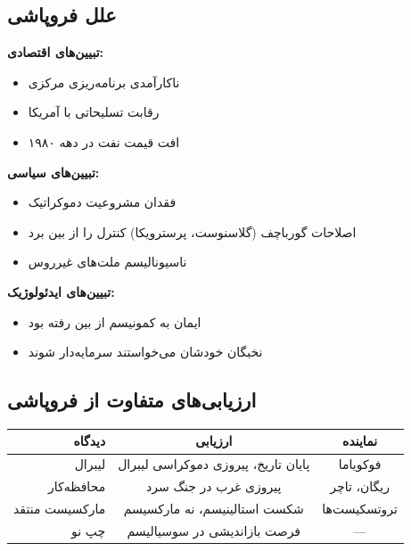 \subsection{علل فروپاشی}

\begin{debatebox}
\textbf{تبیین‌های اقتصادی:}
\begin{itemize}[nosep]
    \item ناکارآمدی برنامه‌ریزی مرکزی
    \item رقابت تسلیحاتی با آمریکا
    \item افت قیمت نفت در دهه ۱۹۸۰
\end{itemize}

\textbf{تبیین‌های سیاسی:}
\begin{itemize}[nosep]
    \item فقدان مشروعیت دموکراتیک
    \item اصلاحات گورباچف (گلاسنوست، پرسترویکا) کنترل را از بین برد
    \item ناسیونالیسم ملت‌های غیرروس
\end{itemize}

\textbf{تبیین‌های ایدئولوژیک:}
\begin{itemize}[nosep]
    \item ایمان به کمونیسم از بین رفته بود
    \item نخبگان خودشان می‌خواستند سرمایه‌دار شوند
\end{itemize}
\end{debatebox}

\subsection{ارزیابی‌های متفاوت از فروپاشی}

\begin{comparebox}
\begin{table}[H]
\centering
\small
\begin{tabular}{r|c|c}
\toprule
\textbf{دیدگاه} & \textbf{ارزیابی} & \textbf{نماینده} \\
\midrule
لیبرال & پایان تاریخ، پیروزی دموکراسی لیبرال & فوکویاما \\
\midrule
محافظه‌کار & پیروزی غرب در جنگ سرد & ریگان، تاچر \\
\midrule
مارکسیست منتقد & شکست استالینیسم، نه مارکسیسم & تروتسکیست‌ها \\
\midrule
چپ نو & فرصت بازاندیشی در سوسیالیسم & — \\
\bottomrule
\end{tabular}
\end{table}
\end{comparebox}

